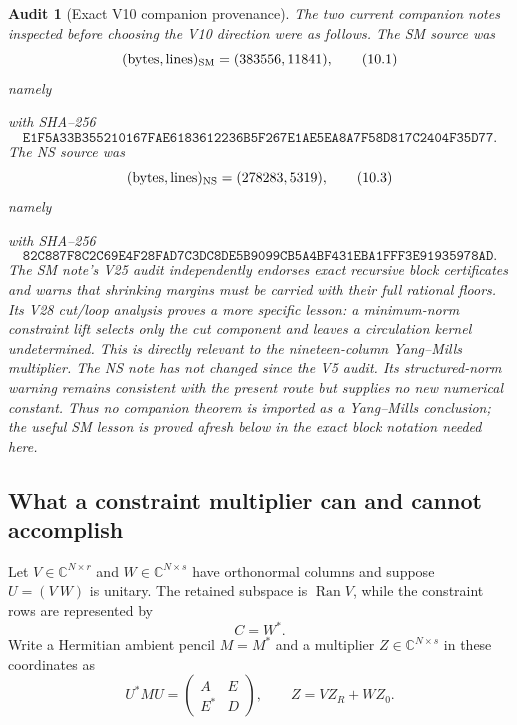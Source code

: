 \documentclass[11pt,oneside]{article}
\newtheorem{audit}[theorem]{Audit}
\theoremstyle{definition}
\theoremstyle{remark}
\newcommand{\Ran}{\operatorname{Ran}}
\begin{document}
\begin{audit}[Exact V10 companion provenance]
\label{audit:newv10-companions}
The two current companion notes inspected before choosing the V10
direction were as follows.  The SM source was
\[
 (\textup{bytes},\textup{lines})_{\mathrm{SM}}
 =(383556,11841),                                         \tag{10.1}
\]
namely
\begin{center}
\footnotesize
{}
\end{center}
with SHA--256
\[
\texttt{E1F5A33B355210167FAE6183612236B5F267E1AE5EA8A7F58D817C2404F35D77}.
                                                               \tag{10.2}
\]
The NS source was
\[
 (\textup{bytes},\textup{lines})_{\mathrm{NS}}
 =(278283,5319),                                          \tag{10.3}
\]
namely
\begin{center}
\footnotesize
{}
\end{center}
with SHA--256
\[
\texttt{82C887F8C2C69E4F28FAD7C3DC8DE5B9099CB5A4BF431EBA1FFF3E91935978AD}.
                                                               \tag{10.4}
\]
The SM note's V25 audit independently endorses exact recursive block
certificates and warns that shrinking margins must be carried with
their full rational floors.  Its V28 cut/loop analysis proves a more
specific lesson: a minimum-norm constraint lift selects only the cut
component and leaves a circulation kernel undetermined.  This is
directly relevant to the nineteen-column Yang--Mills multiplier.
The NS note has not changed since the V5 audit.  Its structured-norm
warning remains consistent with the present route but supplies no
new numerical constant.  Thus no companion theorem is imported as a
Yang--Mills conclusion; the useful SM lesson is proved afresh below
in the exact block notation needed here.
\end{audit}

\subsection{What a constraint multiplier can and cannot accomplish}

Let \(V\in\mathbb C^{N\times r}\) and
\(W\in\mathbb C^{N\times s}\) have orthonormal columns and suppose
\(U=(V\ W)\) is unitary.  The retained subspace is \(\Ran V\), while
the constraint rows are represented by
\[
 C=W^* .                                                   \tag{10.5}
\]
Write a Hermitian ambient pencil \(M=M^*\) and a multiplier
\(Z\in\mathbb C^{N\times s}\) in these coordinates as
\[
 U^*MU=\begin{pmatrix}A&E\\E^*&D\end{pmatrix},
 \qquad Z=VZ_R+WZ_0 .                                    \tag{10.6}
\]
\end{document}
